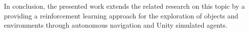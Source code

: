     In conclusion, the presented work extends the related research on this topic by a providing a reinforcement learning approach for the exploration of objects and environments through autonomous navigation and Unity simulated agents.
    
    
    
    


    
